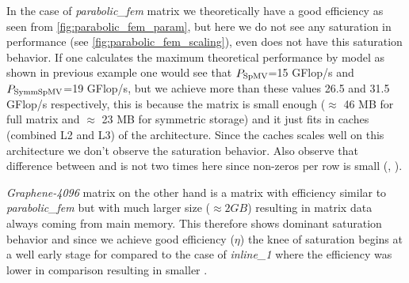In the case of \emph{parabolic\_fem} matrix we theoretically have a good efficiency as seen from \cref{fig:parabolic_fem_param}, but here we do not see any saturation in performance (see \cref{fig:parabolic_fem_scaling}), even \SpMV does not have this saturation behavior. If one calculates the maximum  theoretical performance by \roofline model as shown in previous example one would see that $P_\mathrm{SpMV}$=15 GFlop/s and $P_\mathrm{SymmSpMV}$=19 GFlop/s, but we achieve more than these values 26.5 and 31.5 GFlop/s respectively, this is because the matrix is small enough ($\approx$ 46 MB for full matrix and $\approx$ 23 MB for symmetric storage) and it just fits in caches (combined L2 and L3) of the \SKX architecture. Since the caches scales well on this architecture we don't observe the saturation behavior. Also observe that difference between \SymmSpmv and \SpMV is not two times here since non-zeros per row is small (, ). 

\emph{Graphene-4096} matrix on the other hand is a matrix with efficiency similar to \emph{parabolic\_fem} but with much larger size ($\approx 2 GB$) resulting in matrix data always coming from main memory. This therefore shows dominant saturation behavior and since we achieve good efficiency ($\eta$) the knee of saturation begins at a well early stage for \SymmSpmv compared to  the case of \emph{inline\_1} where the efficiency was lower in comparison resulting in smaller \threadEff.

